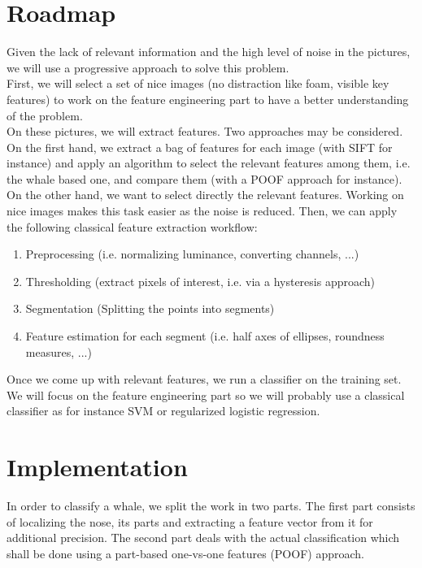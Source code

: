 \documentclass[11pt,a4paper,oneside]{article}
\begin{document}
\section*{Roadmap}
Given the lack of relevant information and the high level of noise in the pictures, we will use a progressive approach to solve this problem. \\
First, we will select a set of nice images (no distraction like foam, visible key features) to work on the feature engineering part to have a better understanding of the problem.\\
On these pictures, we will extract features. Two approaches may be considered. On the first hand, we extract a bag of features for each image (with SIFT for instance) and apply an algorithm to select the relevant features among them, i.e. the whale based one, and compare them (with a POOF approach for instance). On the other hand, we want to select directly the relevant features. Working on nice images makes this task easier as the noise is reduced. Then, we can apply the following classical feature extraction workflow:
\begin{enumerate}
	\item Preprocessing (i.e. normalizing luminance, converting channels, ...)
	\item Thresholding (extract pixels of interest, i.e. via a hysteresis approach)
   	\item Segmentation (Splitting the points into segments)
    	\item Feature estimation for each segment (i.e. half axes of ellipses, roundness measures, ...)
\end{enumerate}
Once we come up with relevant features, we run a classifier on the training set. We will focus on the feature engineering part so we will probably use a classical classifier as for instance SVM or regularized logistic regression. 


\section*{Implementation}
In order to classify a whale, we split the work in two parts. The first part consists of localizing the nose, its parts and extracting a feature vector from it for additional precision. The second part deals with the actual classification which shall be done using a part-based one-vs-one features (POOF) approach. 
\end{document}
